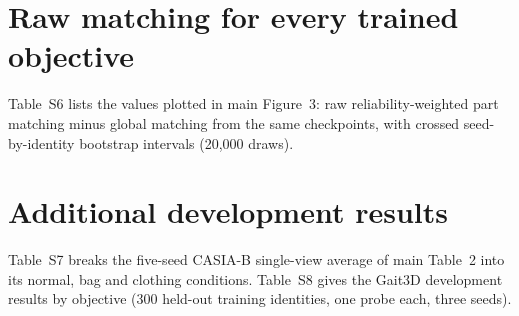 \documentclass[11pt]{article}
\newcommand{\tablesetup}{\small\setlength{\tabcolsep}{4pt}}
\begin{document}
\begin{table}[!htbp]
\centering
\caption{Raw reliability-weighted part matching on frozen metric-baseline
checkpoints at different local-score weights, Rank-1 (\%).}
\label{tab:s-weights}
{\tablesetup
}
\end{table}

\section{Raw matching for every trained objective}
\label{sec:s-raw}

Table~S6 lists the values plotted in main Figure~3: raw reliability-weighted
part matching minus global matching from the same checkpoints, with crossed
seed-by-identity bootstrap intervals (20,000 draws).

\begin{table}[!htbp]
\centering
\caption{Raw reliability-weighted part matching minus global matching (Rank-1
points, crossed 95\% intervals), from each training run's own evaluation. The
checkpoint-control analysis in main Table~4 re-encodes the metric-baseline
checkpoints and differs from these values by at most 0.05 points.}
\label{tab:s-raw}
{\tablesetup\footnotesize
}
\end{table}

\section{Additional development results}
\label{sec:s-dev}

Table~S7 breaks the five-seed CASIA-B single-view average of main Table~2 into
its normal, bag and clothing conditions. Table~S8 gives the Gait3D development
results by objective (300 held-out training identities, one probe each, three
seeds).

\begin{table}[!htbp]
\centering
\caption{CASIA-B development, single-view-gallery protocol excluding identical
views, five seeds (mean $\pm$ seed standard deviation).}
\label{tab:s-single-view}
{\tablesetup\footnotesize
}
\end{table}

\begin{table}[!htbp]
\centering
\caption{Gait3D development Rank-1 (\%), three seeds, 300 probes (mean $\pm$
seed standard deviation where shown).}
\label{tab:s-gait3d-dev}
{\tablesetup
}
\end{table}
\end{document}
